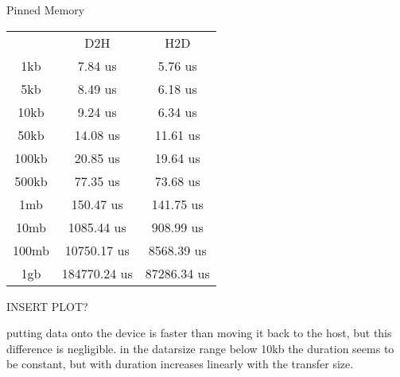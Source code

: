 \documentclass{report}
\begin{document}
Pinned Memory
\begin{center}
    \begin{tabular}{ c c c }
        & D2H & H2D \\ 
     1kb & 7.84 us & 5.76 us \\ 
     5kb & 8.49 us & 6.18 us \\  
     10kb &  9.24  us & 6.34 us \\ 
     50kb & 14.08 us & 11.61 us \\  
     100kb &  20.85   us & 19.64 us \\ 
     500kb & 77.35  us &  73.68 us \\    
     1mb &150.47 us & 141.75 us \\ 
     10mb & 1085.44 us &  908.99 us \\ 
     100mb &  10750.17   us & 8568.39 us \\ 
     1gb & 184770.24 us &  87286.34 us \\ 
    \end{tabular}
    \end{center}

    INSERT PLOT?

    putting data onto the device is faster than moving it back to the host, but this difference is negligible. 
    in the datarsize range below 10kb the duration seems to be constant, but with duration increases linearly with the transfer size.
\end{document}
